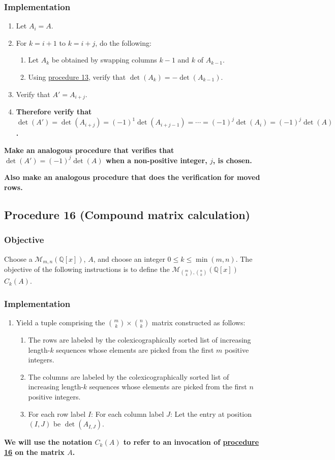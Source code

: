 \documentclass[twocolumn]{article}
\begin{document}
			\subsubsection{Implementation}
				\begin{enumerate}
					\item Let $A_i=A$.
					\item For $k=i+1$ to $k=i+j$, do the following:
					\begin{enumerate}
						\item Let $A_k$ be obtained by swapping columns $k-1$ and $k$ of $A_{k-1}$.
						\item Using \hyperref[sec:procedure 13]{procedure 13}, verify that $\det(A_k)=-\det(A_{k-1})$.
					\end{enumerate}
					\item Verify that $A'=A_{i+j}$.
					\item \textbf{Therefore verify that $\det(A')=\det(A_{i+j})=(-1)^1\det(A_{i+j-1})=\cdots=(-1)^j\det(A_{i})=(-1)^j\det(A)$.}
				\end{enumerate}
			\textbf{Make an analogous procedure that verifies that $\det(A')=(-1)^j\det(A)$ when a non-positive integer, $j$, is chosen.}
			
			\textbf{Also make an analogous procedure that does the verification for moved rows.}
		\subsection{Procedure 16 (Compound matrix calculation)}\label{sec:procedure 16}
			\subsubsection{Objective}
				Choose a $\mathcal{M}_{m,n}(\mathbb{Q}[x])$, $A$, and choose an integer $0\le k\le\min(m,n)$. The objective of the following instructions is to define the $\mathcal{M}_{\binom{m}{k},\binom{n}{k}}(\mathbb{Q}[x])$ $C_k(A)$.
			\subsubsection{Implementation}
				\begin{enumerate}
					\item Yield a tuple comprising the $\binom{m}{k}\times\binom{n}{k}$ matrix constructed as follows:
					\begin{enumerate}
						\item The rows are labeled by the colexicographically sorted list of increasing length-$k$ sequences whose elements are picked from the first $m$ positive integers.
						\item The columns are labeled by the colexicographically sorted list of increasing length-$k$ sequences whose elements are picked from the first $n$ positive integers.
						\item For each row label $I$: For each column label $J$: Let the entry at position $(I,J)$ be $\det(A_{I,J})$.
					\end{enumerate}
				\end{enumerate}
			\textbf{We will use the notation $C_k(A)$ to refer to an invocation of \hyperref[sec:procedure 16]{procedure 16} on the matrix $A$.}
			
\end{document}
